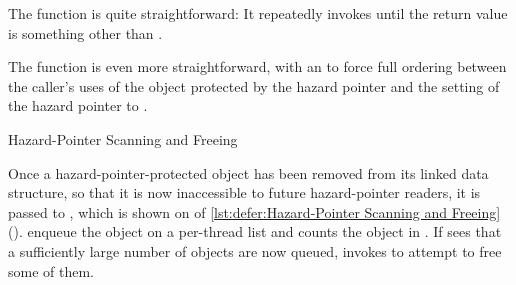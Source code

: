 \begin{fcvref}
\QuickQuizEnd

The  function is quite straightforward: It repeatedly
invokes  until the return value is something other
than .

\QuickQuizEnd

The  function is even more straightforward, with
an  to force full ordering between the caller's uses
of the object protected by the hazard pointer and the setting of
the hazard pointer to .
\end{fcvref}

\begin{listing}
\caption{Hazard-Pointer Scanning and Freeing}
\label{lst:defer:Hazard-Pointer Scanning and Freeing}
\end{listing}

\begin{fcvref}
Once a hazard-pointer-protected object has been removed from its
linked data structure, so that it is now inaccessible to future
hazard-pointer readers, it is passed to ,
which is shown on  of
\cref{lst:defer:Hazard-Pointer Scanning and Freeing}
().
enqueue the object on a per-thread list 
and  counts the object in .
If  sees that a sufficiently large number of objects are now
queued,  invokes  to attempt to
free some of them.
\end{fcvref}

